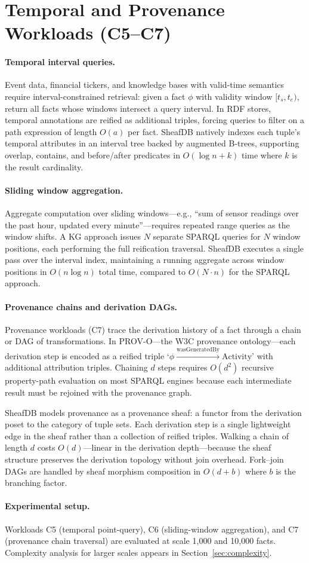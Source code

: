 \section{Temporal and Provenance Workloads (C5--C7)}
\label{sec:temporal_provenance}

\paragraph{Temporal interval queries.}
Event data, financial tickers, and knowledge bases with valid-time semantics require interval-constrained retrieval: given a fact $\phi$ with validity window $[t_s, t_e)$, return all facts whose windows intersect a query interval. In RDF stores, temporal annotations are reified as additional triples, forcing queries to filter on a path expression of length $O(a)$ per fact. SheafDB natively indexes each tuple's temporal attributes in an interval tree backed by augmented B-trees, supporting overlap, contains, and before/after predicates in $O(\log n + k)$ time where $k$ is the result cardinality.

\paragraph{Sliding window aggregation.}
Aggregate computation over sliding windows---e.g., ``sum of sensor readings over the past hour, updated every minute''---requires repeated range queries as the window shifts. A KG approach issues $N$ separate SPARQL queries for $N$ window positions, each performing the full reification traversal. SheafDB executes a single pass over the interval index, maintaining a running aggregate across window positions in $O(n \log n)$ total time, compared to $O(N \cdot n)$ for the SPARQL approach.

\paragraph{Provenance chains and derivation DAGs.}
Provenance workloads (C7) trace the derivation history of a fact through a chain or DAG of transformations. In PROV-O---the W3C provenance ontology---each derivation step is encoded as a reified triple `$\phi \xrightarrow{\text{wasGeneratedBy}} \text{Activity}$' with additional attribution triples. Chaining $d$ steps requires $O(d^2)$ recursive property-path evaluation on most SPARQL engines because each intermediate result must be rejoined with the provenance graph.

SheafDB models provenance as a provenance sheaf: a functor from the derivation poset to the category of tuple sets. Each derivation step is a single lightweight edge in the sheaf rather than a collection of reified triples. Walking a chain of length $d$ costs $O(d)$---linear in the derivation depth---because the sheaf structure preserves the derivation topology without join overhead. Fork--join DAGs are handled by sheaf morphism composition in $O(d + b)$ where $b$ is the branching factor.

\paragraph{Experimental setup.}
Workloads C5 (temporal point-query), C6 (sliding-window aggregation), and C7 (provenance chain traversal) are evaluated at scale 1,000 and 10,000 facts. Complexity analysis for larger scales appears in Section~\ref{sec:complexity}.
\endinput
